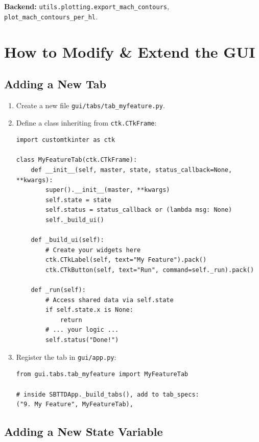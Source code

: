 \documentclass[11pt,letterpaper]{article}
\begin{document}
\textbf{Backend:} \texttt{utils.plotting.export\_mach\_contours},
\texttt{plot\_mach\_contours\_per\_hl}.

\section{How to Modify \& Extend the GUI}

\subsection{Adding a New Tab}

\begin{enumerate}
  \item Create a new file \texttt{gui/tabs/tab\_myfeature.py}.
  \item Define a class inheriting from \texttt{ctk.CTkFrame}:
\begin{lstlisting}
import customtkinter as ctk

class MyFeatureTab(ctk.CTkFrame):
    def __init__(self, master, state, status_callback=None, **kwargs):
        super().__init__(master, **kwargs)
        self.state = state
        self.status = status_callback or (lambda msg: None)
        self._build_ui()

    def _build_ui(self):
        # Create your widgets here
        ctk.CTkLabel(self, text="My Feature").pack()
        ctk.CTkButton(self, text="Run", command=self._run).pack()

    def _run(self):
        # Access shared data via self.state
        if self.state.x is None:
            return
        # ... your logic ...
        self.status("Done!")
\end{lstlisting}

  \item Register the tab in \texttt{gui/app.py}:
\begin{lstlisting}
from gui.tabs.tab_myfeature import MyFeatureTab

# inside SBTTDApp._build_tabs(), add to tab_specs:
("9. My Feature", MyFeatureTab),
\end{lstlisting}
\end{enumerate}

\subsection{Adding a New State Variable}
\end{document}
